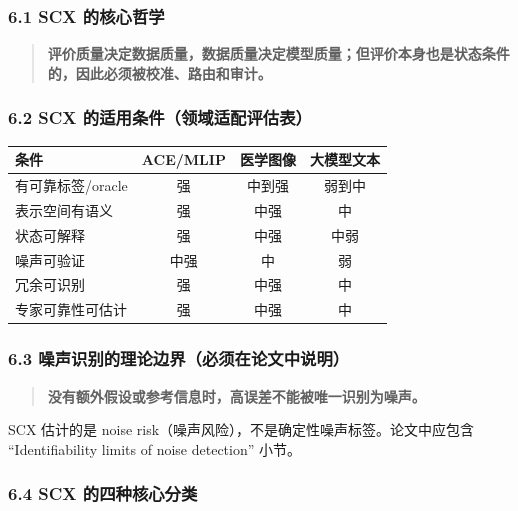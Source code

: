 \documentclass[
  12pt,
]{ctexart}
\begin{document}
\subsubsection{6.1 SCX
的核心哲学}\label{scx-ux7684ux6838ux5fc3ux54f2ux5b66}

\begin{quote}
\textbf{评价质量决定数据质量，数据质量决定模型质量；但评价本身也是状态条件的，因此必须被校准、路由和审计。}
\end{quote}

\subsubsection{6.2 SCX
的适用条件（领域适配评估表）}\label{scx-ux7684ux9002ux7528ux6761ux4ef6ux9886ux57dfux9002ux914dux8bc4ux4f30ux8868}

\begin{longtable}[]{@{}lccc@{}}
\toprule\noalign{}
条件 & ACE/MLIP & 医学图像 & 大模型文本 \\
\midrule\noalign{}
\endhead
\bottomrule\noalign{}
\endlastfoot
有可靠标签/oracle & 强 & 中到强 & 弱到中 \\
表示空间有语义 & 强 & 中强 & 中 \\
状态可解释 & 强 & 中强 & 中弱 \\
噪声可验证 & 中强 & 中 & 弱 \\
冗余可识别 & 强 & 中强 & 中 \\
专家可靠性可估计 & 强 & 中强 & 中 \\
\end{longtable}

\subsubsection{6.3
噪声识别的理论边界（必须在论文中说明）}\label{ux566aux58f0ux8bc6ux522bux7684ux7406ux8bbaux8fb9ux754cux5fc5ux987bux5728ux8bbaux6587ux4e2dux8bf4ux660e}

\begin{quote}
\textbf{没有额外假设或参考信息时，高误差不能被唯一识别为噪声。}
\end{quote}

SCX 估计的是 noise risk（噪声风险），不是确定性噪声标签。论文中应包含
``Identifiability limits of noise detection'' 小节。

\subsubsection{6.4 SCX
的四种核心分类}\label{scx-ux7684ux56dbux79cdux6838ux5fc3ux5206ux7c7b}
\end{document}
